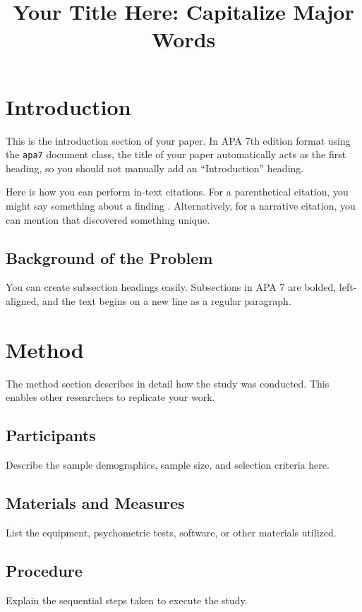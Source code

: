 \documentclass[manuscript,noextraspace]{apa7}
\title{Your Title Here: Capitalize Major Words}
\begin{document}
\maketitle

\section{Introduction}
This is the introduction section of your paper. In APA 7th edition format using the \texttt{apa7} document class, the title of your paper automatically acts as the first heading, so you should not manually add an ``Introduction'' heading. 

Here is how you can perform in-text citations. For a parenthetical citation, you might say something about a finding \parencite{Sample202X}. Alternatively, for a narrative citation, you can mention that \textcite{Sample202X} discovered something unique.

\subsection{Background of the Problem}
You can create subsection headings easily. Subsections in APA 7 are bolded, left-aligned, and the text begins on a new line as a regular paragraph.

\section{Method}
The method section describes in detail how the study was conducted. This enables other researchers to replicate your work.

\subsection{Participants}
Describe the sample demographics, sample size, and selection criteria here.

\subsection{Materials and Measures}
List the equipment, psychometric tests, software, or other materials utilized.

\subsection{Procedure}
Explain the sequential steps taken to execute the study.
\end{document}
